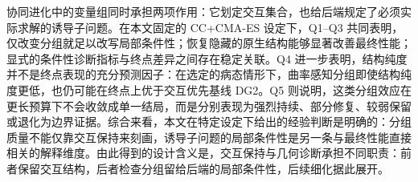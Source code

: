 协同进化中的变量组同时承担两项作用：它划定交互集合，也给后端规定了必须实际求解的诱导子问题。在本文固定的 CC+CMA-ES 设定下，Q1--Q3 共同表明，仅改变分组就足以改写局部条件性；恢复隐藏的原生结构能够显著改善最终性能；显式的条件性诊断指标与终点差异之间存在稳定关联。Q4 进一步表明，结构纯度并不是终点表现的充分预测因子：在选定的病态情形下，曲率感知分组即使结构纯度更低，也仍可能在终点上优于交互优先基线 DG2。Q5 则说明，这类分组效应在更长预算下不会收敛成单一结局，而是分别表现为强烈持续、部分修复、较弱保留或退化为边界证据。综合来看，本文在特定设定下给出的经验判断是明确的：分组质量不能仅靠交互保持来刻画，诱导子问题的局部条件性是另一条与最终性能直接相关的解释维度。由此得到的设计含义是，交互保持与几何诊断承担不同职责：前者保留交互结构，后者检查分组留给后端的局部条件性，后续细化据此展开。
